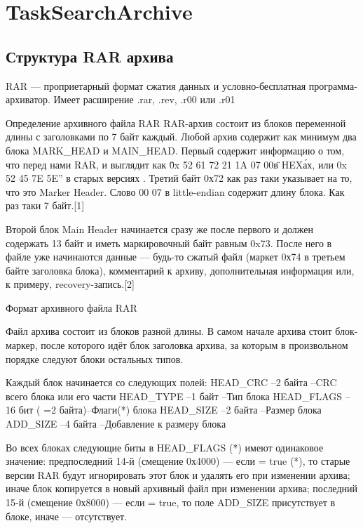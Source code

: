 \section{TaskSearchArchive}

\subsection{Структура RAR архива}
RAR — проприетарный формат сжатия данных и условно-бесплатная программа-архиватор. Имеет расширение .rar, .rev, .r00 или .r01

Определение архивного файла RAR
RAR-архив состоит из блоков переменной длины с заголовками по 7 байт каждый. Любой архив содержит как минимум два блока MARK_HEAD и MAIN_HEAD. Первый содержит информацию о том, что перед нами RAR, и выглядит как \"0x 52 61 72 21 1A 07 00\" в HEX\'ах, или 0x 52 45 7E 5E” в старых версиях . Третий байт 0х72 как раз таки указывает на то, что это Marker Header. Слово 00 07 в little-endian содержит длину блока. Как раз таки 7 байт.[1]

Второй блок Main Header начинается сразу же после первого и должен содержать 13 байт и иметь маркировочный байт равным 0x73. После него в файле уже начинаются данные — будь-то сжатый файл (маркет 0х74 в третьем байте заголовка блока), комментарий к архиву, дополнительная информация или, к примеру, recovery-запись.[2]

Формат архивного файла RAR
                
Файл архива состоит из блоков разной длины.
В самом начале архива стоит блок-маркер, после которого идёт блок заголовка архива, за которым в произвольном порядке следуют блоки остальных типов.
                
                Каждый блок начинается со следующих полей:         
HEAD_CRC --2 байта --CRC всего блока или его части
HEAD_TYPE --1 байт --Тип блока 
HEAD_FLAGS --16 бит ( =2 байта)--Флаги(*) блока     
HEAD_SIZE --2 байта --Размер блока 
ADD_SIZE --4 байта --Добавление к размеру блока
            
Во всех блоках следующие биты в HEAD_FLAGS (*) имеют одинаковое значение:         
предпоследний 14-й (смещение 0х4000) — если = true (*), то старые версии RAR будут игнорировать этот блок и удалять его при изменении архива; иначе блок копируется в новый архивный файл при изменении архива;
последний 15-й (смещение 0х8000) — если = true, то поле ADD_SIZE присутствует в блоке, иначе — отсутствует.
                
